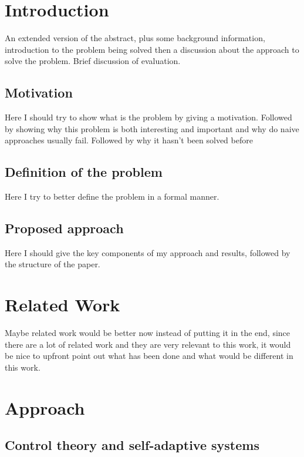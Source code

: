 \section{Introduction}

An extended version of the abstract, plus some background information, introduction to the problem being solved then a discussion about the approach to solve the problem. Brief discussion of evaluation.

\subsection{Motivation}

Here I should try to show what is the problem by giving a motivation. Followed by showing why this problem is both interesting and important and why do naive approaches usually fail. Followed by why it hasn't been solved before

\subsection{Definition of the problem}

Here I try to better define the problem in a formal manner.

\subsection{Proposed approach}

Here I should give the key components of my approach and results, followed by the structure of the paper.

\section{Related Work}

Maybe related work would be better now instead of putting it in the end, since there are a lot of related work and they are very relevant to this work, it would be nice to upfront point out what has been done and what would be different in this work.


\section{Approach}

\subsection{Control theory and self-adaptive systems}

